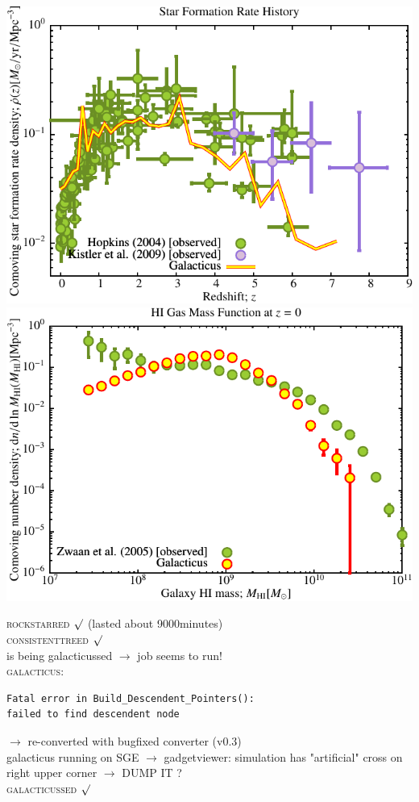 \documentclass[a4paper,11pt,fleqn,oneside]{book}
\begin{document}
\includegraphics[scale=0.6]{fuenfincr256_2/Star_Formation_History.pdf}
\includegraphics[scale=0.6]{fuenfincr256_2/HI_Gas_Mass_Function.pdf}


\textsc{rockstarred} $\surd$ (lasted about 9000minutes) \\
\textsc{consistenttreed} $\surd$ \\ 
is being galacticussed $\rightarrow$ job seems to run! \\
 \textsc{galacticus}:
 \begin{verbatim}
Fatal error in Build_Descendent_Pointers():
failed to find descendent node 
\end{verbatim}
$\rightarrow$ re-converted with bugfixed converter (v0.3) \\
galacticus running on SGE
$\rightarrow$ gadgetviewer: simulation has "artificial" cross on right upper corner $\rightarrow$ DUMP IT ? \\
\textsc{galacticussed} $\surd$
\end{document}
